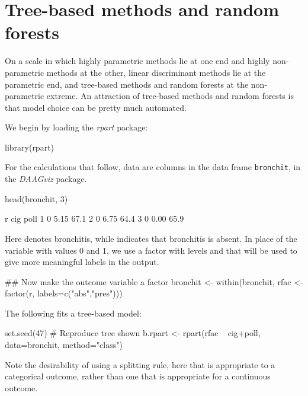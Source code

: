 \section{Tree-based methods and random forests}
On a scale in which highly parametric methods lie at one end and
highly non-parametric methods at the other, linear discriminant
methods lie at the parametric end, and tree-based methods and random
forests at the non-parametric extreme.  An attraction of tree-based
methods and random forests is that model choice can be pretty much
automated.

We begin by loading the {\em rpart} package:
\begin{Schunk}
\begin{Sinput}
library(rpart)
\end{Sinput}
\end{Schunk}

For the calculations that follow, data are columns in the data frame
\texttt{bronchit}, in the {\em DAAGviz} package.
\begin{Schunk}
\begin{Sinput}
head(bronchit, 3)
\end{Sinput}
\begin{Soutput}
  r  cig poll
1 0 5.15 67.1
2 0 6.75 64.4
3 0 0.00 65.9
\end{Soutput}
\end{Schunk}
Here  denotes bronchitis,  while 
indicates that bronchitis is absent.
In place of the variable  with values 0 and 1, we use a
factor with levels  and  that will be used
to give more meaningful labels in the output.
\begin{Schunk}
\begin{Sinput}
## Now make the outcome variable a factor
bronchit <-
  within(bronchit,
         rfac <- factor(r, labels=c("abs","pres")))
\end{Sinput}
\end{Schunk}

The following fits a tree-based model:
\begin{Schunk}
\begin{Sinput}
set.seed(47)   # Reproduce tree shown
b.rpart <- rpart(rfac ~ cig+poll, data=bronchit,
                 method="class")
\end{Sinput}
\end{Schunk}
\noindent
Note the desirability of using a splitting rule, here 
that is appropriate to a categorical outcome, rather than one that
is appropriate for a continuous outcome.

